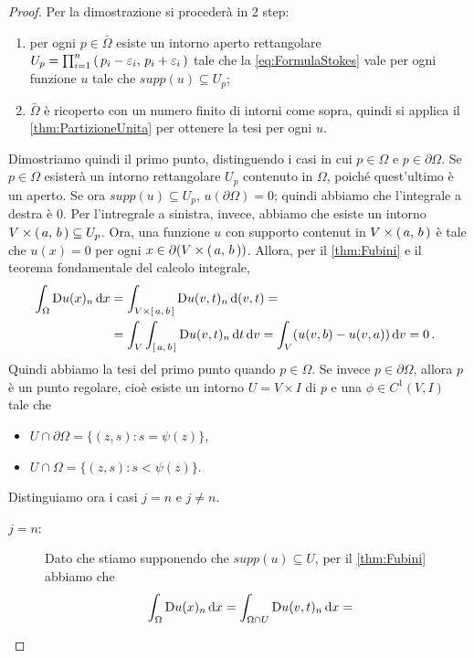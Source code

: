 \begin{proof}
	Per la dimostrazione si procederà in 2 step:
	\begin{enumerate}
		\item per ogni $p\in \bar \Omega$ esiste un intorno aperto rettangolare $U_p=\prod_{i=1}^n \left(\,p_i-\varepsilon_i,\,p_i+\varepsilon_i\,\right)$
			tale che la \cref{eq:FormulaStokes} vale per ogni funzione $u$ tale che $supp(u)\subseteq U_p$;
		\item $\bar \Omega$ è ricoperto con un numero finito di intorni come sopra, quindi si applica il \cref{thm:PartizioneUnita} per ottenere
			la tesi per ogni $u$.
	\end{enumerate}
	
	Dimostriamo quindi il primo punto, distinguendo i casi in cui $p\in \Omega$ e $p\in \partial \Omega$.
	Se $p\in \Omega$ esisterà un intorno rettangolare $U_p$ contenuto in $\Omega$, poiché quest'ultimo è un aperto. Se ora $supp(u)\subseteq U_p$,
	$u(\partial \Omega)=0$; quindi abbiamo che l'integrale a destra è $0$. Per l'intregrale a sinistra, invece, abbiamo che esiste un intorno
	$V\times \left(\,a,\,b\,\right) \subseteq U_p$. Ora, una funzione $u$ con supporto contenut in $V\times \left(\,a,\,b\,\right)$ è tale che $u(x)=0$ per ogni
	$x\in \partial (V\times \left(\,a,\,b\,\right))$. Allora, per il \cref{thm:Fubini} e il teorema fondamentale del calcolo integrale,
	\begin{align*}
		\int_{\Omega} \mathrm D u(x)_n \,\mathrm d x &= \int_{V\times \left[\,a,\,b\,\right]} \mathrm D u(v,t)_n \,\mathrm d (v,t) = \\
		& = \int_V \int_{\left[\,a,\,b\,\right]} \mathrm D u(v,t)_n \,\mathrm d t \,\mathrm d v = \int_V (u(v,b) - u(v,a)) \,\mathrm d v = 0\, \text{. }
	\end{align*}
	Quindi abbiamo la tesi del primo punto quando $p\in\Omega$. Se invece $p\in \partial \Omega$, allora $p$ è un punto regolare, cioè esiste
	un intorno $U=V\times I$ di $p$ e una $\phi\in C^1(V,I)$ tale che
	\begin{itemize}
		\item $U\cap \partial \Omega = \{(z,s):s=\psi(z)\}$,
		\item $U\cap \Omega = \{(z,s):s<\psi(z)\}$.
	\end{itemize}
	Distinguiamo ora i casi $j=n$ e $j\neq n$.
	\begin{description}
		\item [$j=n$:] Dato che stiamo supponendo che $supp(u)\subseteq U$, per il \cref{thm:Fubini} abbiamo che
			\begin{align*}
				\int_{\Omega} \Diff u(x)_n \de x  &= \int_{\Omega\cap U} \Diff u(v,t)_n\de x =

\end{align*}
\end{description}
\end{proof}
